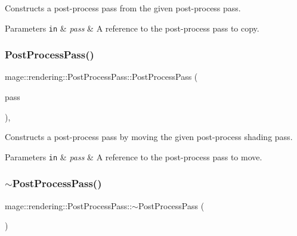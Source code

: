Constructs a post-\/process pass from the given post-\/process pass.


\begin{DoxyParams}[1]{Parameters}
\mbox{\tt in}  & {\em pass} & A reference to the post-\/process pass to copy. \\
\hline
\end{DoxyParams}
\mbox{\label{classmage_1_1rendering_1_1_post_process_pass_aa57a8a38643fc76d0cdae8106c3de7e3}} 
\subsubsection{\texorpdfstring{Post\+Process\+Pass()}{PostProcessPass()}\hspace{0.1cm}{\footnotesize\ttfamily [3/3]}}
{\footnotesize\ttfamily mage\+::rendering\+::\+Post\+Process\+Pass\+::\+Post\+Process\+Pass (\begin{DoxyParamCaption}\item[{\mbox{\hyperlink{classmage_1_1rendering_1_1_post_process_pass}{Post\+Process\+Pass}} \&\&}]{pass }\end{DoxyParamCaption})\hspace{0.3cm}{\ttfamily [default]}, {\ttfamily [noexcept]}}

Constructs a post-\/process pass by moving the given post-\/process shading pass.


\begin{DoxyParams}[1]{Parameters}
\mbox{\tt in}  & {\em pass} & A reference to the post-\/process pass to move. \\
\hline
\end{DoxyParams}
\mbox{\label{classmage_1_1rendering_1_1_post_process_pass_a41e82fe23fdc3a5726989edb0bb334ea}} 
\subsubsection{\texorpdfstring{$\sim$\+Post\+Process\+Pass()}{~PostProcessPass()}}
{\footnotesize\ttfamily mage\+::rendering\+::\+Post\+Process\+Pass\+::$\sim$\+Post\+Process\+Pass (\begin{DoxyParamCaption}{ }\end{DoxyParamCaption})\hspace{0.3cm}{\ttfamily [default]}}

